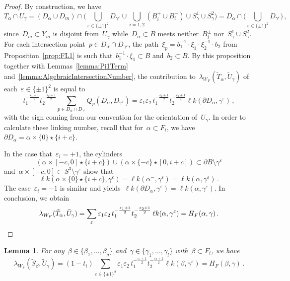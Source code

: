 \documentclass[10.9pt,a4paper]{amsart}
\newtheorem{lemma}[theorem]{Lemma}
\theoremstyle{definition}
\theoremstyle{remark}
\newcommand{\lk}{\ell k}
\begin{document}
\begin{proof}
By construction, we have
\[
T_{\alpha} \cap U_{\gamma} = (D_{\alpha} \cup D_m) \cap \Big( \bigcup_{\varepsilon \in \{\pm1\}^2} D_{\gamma^\varepsilon} \cup \bigcup _{i=1,2} \left(B_i^+ \cup B_i^-\right) \cup S_{\gamma}^1 \cup S_{\gamma}^2 \Big)=D_{\alpha} \cap \Big( \bigcup_{\varepsilon \in \{\pm1\}^2} D_{\gamma^\varepsilon} \Big)\,,
\]
since~$D_m\subset Y_m$ is disjoint from~$U_{\gamma}$ while~$D_{\alpha} \subset B$ meets neither~$B_i^\pm$ nor~$S_{\gamma}^1\cup S_{\gamma}^2$. 
For each intersection point~$p \in D_{\alpha} \cap D_{\gamma^\varepsilon}$, the path~$\xi_p=b_1^{-1}\cdot\xi_1\cdot\xi^{-1}_2\cdot b_2$ from Proposition~\ref{prop:FL1} is such that~$b_1^{-1}\cdot\xi_1\subset B$ and~$b_2\subset B$. By this proposition together with Lemmas~\ref{lemma:Pi1Term} and~\ref{lemma:AlgebraicIntersectionNumber}, the contribution to~$\lambda_{W_F}(\tilde T_{\alpha},\tilde U_{\gamma})$ of each~$\varepsilon \in \{\pm1\}^2$ is equal to 
\[ 
t_1^{-\frac{\varepsilon_1+1}{2}} t_2^{-\frac{\varepsilon_2+1}{2}} \sum_{p \in D_{\alpha} \cap D_{\gamma^\varepsilon}} Q_p(D_{\alpha}, D_{\gamma^\varepsilon})=\varepsilon_1\varepsilon_2\,t_1^{-\frac{\varepsilon_1+1}{2}} t_2^{-\frac{\varepsilon_2+1}{2}}\lk(\partial D_{\alpha},\gamma^\varepsilon)\,,
\]
with the sign coming from our convention for the orientation of~$U_{\gamma}$.
In order to calculate these linking number, recall that  for~$\alpha\subset F_i$, we have~$\partial D_{\alpha}=\alpha \times \{0\} \star \{i+c\}$.
%

In the case that~$\varepsilon_i =+1$, the cylinders
\[
(\alpha \times [-c,0] \star \{i+c\}) \cup (\alpha \times \{-c\} \star [0,i+c])\subset \partial B\setminus\gamma^\varepsilon
\]
and~$\alpha \times [-c,0] \subset S^3\setminus\gamma^\varepsilon$ show that
\[
\lk(\alpha \times \{0\} \star \{i+c\}, \gamma^\varepsilon) = \lk(\alpha^-, \gamma^\varepsilon)= \lk(\alpha, \gamma^\varepsilon)\,. 
\]
The case~$\varepsilon_i=-1$ is similar and yields~$\lk(\partial D_{\alpha},\gamma^\varepsilon)=\lk(\alpha,\gamma^\varepsilon)$.
In conclusion, we obtain
\[
\lambda_{W_F}(\tilde T_{\alpha},\tilde U_{\gamma}) 
= \sum_{\varepsilon} \varepsilon_1\varepsilon_2\, t_1^{-\frac{\varepsilon_1+1}{2}} t_2^{-\frac{\varepsilon_2+1}{2}} \, \lk(\alpha, \gamma^\varepsilon)
=H_F(\alpha, \gamma)\,.\qedhere
\]
\end{proof}





\begin{lemma}
\label{lemma:IntSU}
For any~$\beta\in\{\beta_1,\dots,\beta_g\}$ and~$\gamma\in\{\gamma_1,\dots,\gamma_l\}$ with~$\beta\subset F_i$,
we have
\[
\lambda_{W_F}(\tilde S_{\beta},\tilde U_{\gamma}) = (1-t_{i}) \sum_{\varepsilon \in \{\pm1\}^2} \varepsilon_1\varepsilon_2 \, t_1^{-\frac{\varepsilon_1 + 1}{2}} t_2^{-\frac{\varepsilon_2 + 1}{2}}  \lk(\beta, \gamma^\varepsilon) = H_F(\beta, \gamma)\,.
\] 
\end{lemma}
\end{document}
